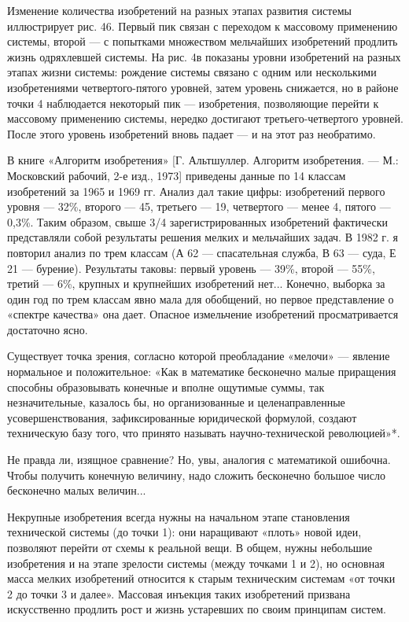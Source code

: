 Изменение  количества изобретений  на разных  этапах развития  системы
иллюстрирует  рис.  46. Первый  пик  связан  с переходом  к  массовому
применению  системы,  второй  —   с  попытками  множеством  мельчайших
изобретений продлить  жизнь одряхлевшей  системы. На рис.  4в показаны
уровни изобретений  на разных  этапах жизни системы:  рождение системы
связано  с  одним   или  несколькими  изобретениями  четвертого-пятого
уровней,  затем уровень  снижается, но  в районе  точки 4  наблюдается
некоторый  пик   —  изобретения,   позволяющие  перейти   к  массовому
применению  системы,  нередко достигают  третьего-четвертого  уровней.
После  этого  уровень  изобретений  вновь  падает  —  и  на  этот  раз
необратимо.

В книге «Алгоритм изобретения» [Г. Альтшуллер. Алгоритм изобретения. —
М.: Московский рабочий, 2-е изд., 1973] приведены данные по 14 классам
изобретений за  1965 и  1969 гг. Анализ  дал такие  цифры: изобретений
первого  уровня —  32\%,  второго —  45, третьего  —  19, четвертого  —
менее 4,  пятого — 0,3\%.  Таким образом, свыше  3/4 зарегистрированных
изобретений фактически представляли собой  результаты решения мелких и
мельчайших задач. В 1982 г. я повторил  анализ по трем классам (А 62 —
спасательная служба, В 63 — суда,  Е 21 — бурение). Результаты таковы:
первый уровень — 39\%, второй —  55\%, третий — 6\%, крупных и крупнейших
изобретений нет... Конечно,  выборка за один год по  трем классам явно
мала для обобщений,  но первое представление о  «спектре качества» она
дает. Опасное измельчение изобретений просматривается достаточно ясно.

Существует  точка зрения,  согласно  которой  преобладание «мелочи»  —
явление нормальное и положительное: «Как в математике бесконечно малые
приращения способны образовывать конечные и вполне ощутимые суммы, так
незначительные,  казалось  бы,  но организованные  и  целенаправленные
усовершенствования,  зафиксированные   юридической  формулой,  создают
техническую  базу   того,  что  принято   называть  научно-технической
революцией»*.


Не  правда ли,  изящное  сравнение? Но,  увы,  аналогия с  математикой
ошибочна. Чтобы  получить конечную  величину, надо  сложить бесконечно
большое число бесконечно малых величин...

Некрупные  изобретения всегда  нужны  на  начальном этапе  становления
технической системы (до  точки 1): они наращивают  «плоть» новой идеи,
позволяют перейти от  схемы к реальной вещи. В  общем, нужны небольшие
изобретения и  на этапе  зрелости системы  (между точками  1 и  2), но
основная  масса  мелких  изобретений относится  к  старым  техническим
системам «от  точки 2  до точки  3 и  далее». Массовая  инъекция таких
изобретений призвана искусственно продлить  рост и жизнь устаревших по
своим принципам систем.

